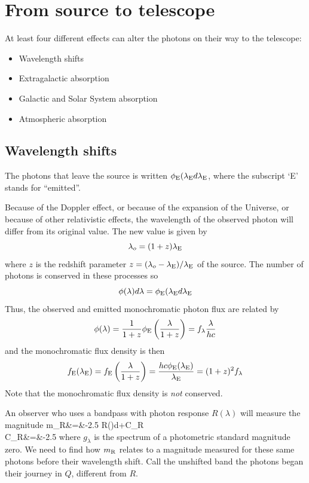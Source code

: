 \section{From source to telescope}
At least four different effects can alter the photons on their way to
the telescope:
\begin{itemize}
\item Wavelength shifts
\item Extragalactic absorption
\item Galactic and Solar System absorption
\item Atmospheric absorption
\end{itemize}
\subsection{Wavelength shifts}
The photons that leave the source is written $\phi_{\rm
  E}(\lambda_{\rm E}d\lambda_{\rm E}$, where the subscript `E' stands
for ``emitted''. 

Because of the Doppler effect, or because of the expansion of the
Universe, or because of other relativistic effects, the wavelength of
the observed photon will differ from its original value. The new value
is given by
\[
\lambda_o=(1+z)\lambda_{\rm E}
\]
where $z$ is the redshift parameter $z={(\lambda_o-\lambda_{\rm
  E})/\lambda_{\rm E}}$ of the source. The number of photons is
conserved in these processes so 
\[
\phi(\lambda)d\lambda=\phi_{\rm E}(\lambda_{\rm E}d\lambda_{\rm E}
\]
Thus, the observed and emitted monochromatic photon flux are related by 
\[
\phi(\lambda)=\frac{1}{1+z}\phi_{\rm E}\left(\frac{\lambda}{1+z}\right)=f_\lambda\frac{\lambda}{hc}
\]
and the monochromatic flux density is then
\[
f_{\rm E}(\lambda_{\rm E})=f_{\rm
  E}\left(\frac{\lambda}{1+z}\right)=\frac{hc\phi_{\rm E}(\lambda_{\rm
    E})}{\lambda_{\rm E}}=(1+z)^2f_\lambda
\]
Note that the monochromatic flux density is {\it not} conserved.

An observer who uses a bandpass with photon response $R(\lambda)$ will
measure the magnitude
\bua
m_{\rm R}&=&-2.5\log
{ \int R(\lambda)\frac{\phi(\lambda)}{\lambda}d\lambda}+C_{\rm R} \\
C_{\rm R}&=&-2.5
\eua
where $g_\lambda$ is the spectrum of a photometric standard magnitude
zero. We need to find how $m_{\rm R}$ relates to a magnitude measured
for these same photons before their wavelength shift. Call the
unshifted band the photons began their journey in $Q$, different from $R$.

